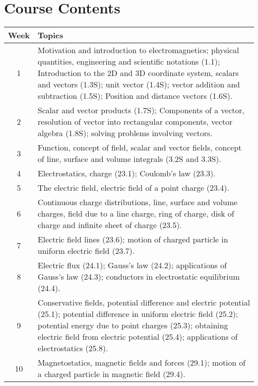 \documentclass[12pt,a4paper]{article}
\begin{document}
\section{Course Contents}
\begin{center}
\vspace{-0.5cm}
	\begin{longtable}{|c|p{13cm}|}
	\hline \hline
		\rule{0pt}{2.6ex} \textbf{Week} & \textbf{Topics}\\
		\hline
		1 \rule{0pt}{2.6ex} & Motivation and introduction to electromagnetics; physical quantities, engineering and scientific notations (1.1); Introduction to the 2D and 3D coordinate system, scalars and vectors (1.3S); unit vector (1.4S); vector addition and subtraction (1.5S); Position and distance vectors (1.6S).\\
		\hline
		2 \rule{0pt}{2.6ex} & Scalar and vector products (1.7S); Components of a vector, resolution of vector into rectangular components, vector algebra (1.8S); solving problems involving vectors.\\
		\hline
		3 \rule{0pt}{2.6ex} & Function, concept of field, scalar and vector fields, concept of line, surface and volume integrals (3.2S and 3.3S).\\
		\hline
		4 \rule{0pt}{2.6ex} & Electrostatics, charge (23.1); Coulomb's law (23.3).\\
		\hline
		5 \rule{0pt}{2.6ex} &  The electric field, electric field of a point charge (23.4).\\
		\hline
		6 \rule{0pt}{2.6ex} & Continuous charge distributions, line, surface and volume charges,  field due to a line charge, ring of charge, disk of charge and infinite sheet of charge (23.5).\\
		\hline
		7 \rule{0pt}{2.6ex} & Electric field lines (23.6); motion of charged particle in uniform electric field (23.7).\\
		\hline
		8 \rule{0pt}{2.6ex} & Electric flux (24.1); Gauss's law (24.2); applications of Gauss's law (24.3); conductors in electrostatic equilibrium (24.4).\\
		\hline
		9 \rule{0pt}{2.6ex} & Conservative fields, potential difference and electric potential (25.1); potential difference in uniform electric field (25.2); potential energy due to point charges (25.3); obtaining electric field from electric potential (25.4); applications of electrostatics (25.8).\\
		\hline
		10 \rule{0pt}{2.6ex} & Magnetostatics, magnetic fields and forces (29.1); motion of a charged particle in magnetic field (29.4).\\

\end{longtable}
\end{center}
\end{document}
